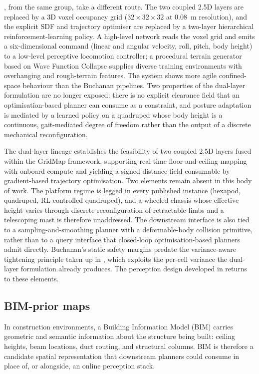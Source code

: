 \documentclass[11pt,a4paper]{article}
\begin{document}
\citet{mikiLearningWalkConfined2024}, from the same group, take a different route. The two coupled 2.5D layers are replaced by a 3D voxel occupancy grid (\(32 \times 32 \times 32\) at \SI{0.08}{\metre} resolution), and the explicit SDF and trajectory optimiser are replaced by a two-layer hierarchical reinforcement-learning policy. A high-level network reads the voxel grid and emits a six-dimensional command (linear and angular velocity, roll, pitch, body height) to a low-level perceptive locomotion controller; a procedural terrain generator based on Wave Function Collapse supplies diverse training environments with overhanging and rough-terrain features. The system shows more agile confined-space behaviour than the Buchanan pipelines. Two properties of the dual-layer formulation are no longer exposed: there is no explicit clearance field that an optimisation-based planner can consume as a constraint, and posture adaptation is mediated by a learned policy on a quadruped whose body height is a continuous, gait-mediated degree of freedom rather than the output of a discrete mechanical reconfiguration.

The dual-layer lineage establishes the feasibility of two coupled 2.5D layers fused within the GridMap framework, supporting real-time floor-and-ceiling mapping with onboard compute and yielding a signed distance field consumable by gradient-based trajectory optimisation. Two elements remain absent in this body of work. The platform regime is legged in every published instance (hexapod, quadruped, RL-controlled quadruped), and a wheeled chassis whose effective height varies through discrete reconfiguration of retractable limbs and a telescoping mast is therefore unaddressed. The downstream interface is also tied to a sampling-and-smoothing planner with a deformable-body collision primitive, rather than to a query interface that closed-loop optimisation-based planners admit directly. Buchanan's static safety margins predate the variance-aware tightening principle taken up in , which exploits the per-cell variance the dual-layer formulation already produces. The perception design developed in  returns to these elements.

\subsection{BIM-prior maps}
\label{sec:sq1:bim}

In construction environments, a Building Information Model (BIM) carries geometric and semantic information about the structure being built: ceiling heights, beam locations, duct routing, and structural columns. BIM is therefore a candidate spatial representation that downstream planners could consume in place of, or alongside, an online perception stack.
\end{document}
